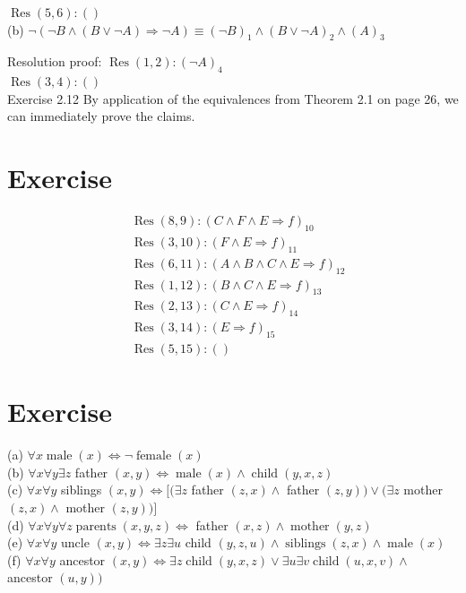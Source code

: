 \documentclass[10pt]{book}
\begin{document}
$\operatorname{Res}(5,6):()$\\
(b) $\neg(\neg B \wedge(B \vee \neg A) \Rightarrow \neg A) \equiv(\neg B)_{1} \wedge(B \vee \neg A)_{2} \wedge(A)_{3}$

Resolution proof: $\operatorname{Res}(1,2):(\neg A)_{4}$\\
$\operatorname{Res}(3,4):()$\\
Exercise 2.12 By application of the equivalences from Theorem 2.1 on page 26, we can immediately prove the claims.

\section{Exercise}
$$
\begin{aligned}
& \operatorname{Res}(8,9):(C \wedge F \wedge E \Rightarrow f)_{10} \\
& \operatorname{Res}(3,10):(F \wedge E \Rightarrow f)_{11} \\
& \operatorname{Res}(6,11):(A \wedge B \wedge C \wedge E \Rightarrow f)_{12} \\
& \operatorname{Res}(1,12):(B \wedge C \wedge E \Rightarrow f)_{13} \\
& \operatorname{Res}(2,13):(C \wedge E \Rightarrow f)_{14} \\
& \operatorname{Res}(3,14):(E \Rightarrow f)_{15} \\
& \operatorname{Res}(5,15):()
\end{aligned}
$$

\section{Exercise}
(a) $\forall x \operatorname{male}(x) \Leftrightarrow \neg \operatorname{female}(x)$\\
(b) $\forall x \forall y \exists z$ father $(x, y) \Leftrightarrow \operatorname{male}(x) \wedge \operatorname{child}(y, x, z)$\\
(c) $\forall x \forall y$ siblings $(x, y) \Leftrightarrow[(\exists z$ father $(z, x) \wedge$ father $(z, y)) \vee(\exists z$ mother $(z, x) \wedge$ mother $(z, y))]$\\
(d) $\forall x \forall y \forall z \operatorname{parents}(x, y, z) \Leftrightarrow$ father $(x, z) \wedge \operatorname{mother}(y, z)$\\
(e) $\forall x \forall y$ uncle $(x, y) \Leftrightarrow \exists z \exists u$ child $(y, z, u) \wedge \operatorname{siblings}(z, x) \wedge \operatorname{male}(x)$\\
(f) $\forall x \forall y$ ancestor $(x, y) \Leftrightarrow \exists z \operatorname{child}(y, x, z) \vee \exists u \exists v \operatorname{child}(u, x, v) \wedge$ ancestor $(u, y))$
\end{document}
